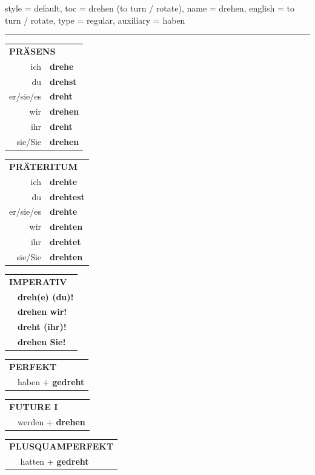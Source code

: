 \begin{verbentry}{
  style = {default},
  toc = {drehen (to turn / rotate)},
  name = {drehen},
  english = {to turn / rotate},
  type = {regular},
  auxiliary = {haben}
}


\vspace{5pt}
\hrule
\vspace{5pt}

\begin{tabular}{rl}
\multicolumn{2}{l}{\textbf{PRÄSENS}}\\
ich & \textbf{drehe}\\
du & \textbf{drehst}\\
er/sie/es & \textbf{dreht}\\
wir & \textbf{drehen}\\
ihr & \textbf{dreht}\\
sie/Sie & \textbf{drehen}\\
\end{tabular}
\hfill
\begin{tabular}{rl}
\multicolumn{2}{l}{\textbf{PRÄTERITUM}}\\
ich & \textbf{drehte}\\
du & \textbf{drehtest}\\
er/sie/es & \textbf{drehte}\\
wir & \textbf{drehten}\\
ihr & \textbf{drehtet}\\
sie/Sie & \textbf{drehten}\\
\end{tabular}
\hfill
\begin{tabular}{rl}
\multicolumn{2}{l}{\textbf{IMPERATIV}}\\
& \textbf{dreh(e) (du)!}\\
& \textbf{drehen wir!}\\
& \textbf{dreht (ihr)!}\\
& \textbf{drehen Sie!}\\
\end{tabular}

\vspace{10pt}

\begin{tabular}{rl}
\multicolumn{2}{l}{\textbf{PERFEKT}}\\
& haben + \textbf{gedreht}\\
\end{tabular}
\hfill
\begin{tabular}{rl}
\multicolumn{2}{l}{\textbf{FUTURE I}}\\
& werden + \textbf{drehen}\\
\end{tabular}
\hfill
\begin{tabular}{rl}
\multicolumn{2}{l}{\textbf{PLUSQUAMPERFEKT}}\\
& hatten + \textbf{gedreht}\\
\end{tabular}


\end{verbentry}
